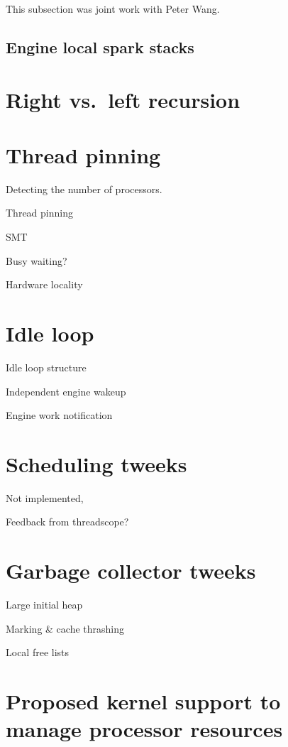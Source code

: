 This subsection was joint work with Peter Wang.

\subsection{Engine local spark stacks}

\section{Right vs.\ left recursion}

\section{Thread pinning}

Detecting the number of processors.

Thread pinning

SMT

Busy waiting?

Hardware locality

\section{Idle loop}

Idle loop structure

Independent engine wakeup

Engine work notification

\section{Scheduling tweeks}

Not implemented,

Feedback from threadscope?

\section{Garbage collector tweeks}

Large initial heap

Marking \& cache thrashing

Local free lists

\section{Proposed kernel support to manage processor resources}

    

